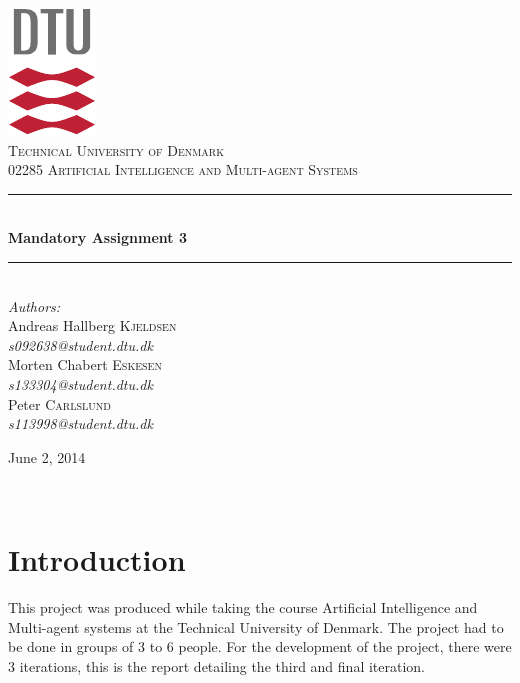 \documentclass[11pt]{article}
\newcommand{\HRule}{\rule{\linewidth}{0.5mm}}
\begin{document}
\begin{titlepage}
\begin{center}

\includegraphics[scale=2.0]{../GFX/dtu_logo.pdf}\\[1cm]

\textsc{\LARGE Technical University of Denmark}\\[1.5cm]

\textsc{\Large 02285 Artificial Intelligence and Multi-agent Systems}\\[0.5cm]

\HRule \\[0.4cm]
{\huge \bfseries Mandatory Assignment 3}\\[0.1cm]
\HRule \\[1.5cm]

\large
\emph{Authors:}
\\[10pt]
Andreas Hallberg \textsc{Kjeldsen}\\
\emph{s092638@student.dtu.dk}
\\[10pt]
Morten Chabert \textsc{Eskesen}\\
\emph{s133304@student.dtu.dk}
\\[10pt]
Peter \textsc{Carlslund}\\
\emph{s113998@student.dtu.dk}

\vfill

{\large June 2, 2014}

\end{center}
\end{titlepage}

${}$
\vspace{-.55cm}

\tableofcontents
\clearpage

\section{Introduction}
This project was produced while taking the course Artificial Intelligence and Multi-agent systems at the Technical University of Denmark. The project had to be done in groups of 3 to 6 people. For the development of the project, there were 3 iterations, this is the report detailing the third and final iteration.
\end{document}
